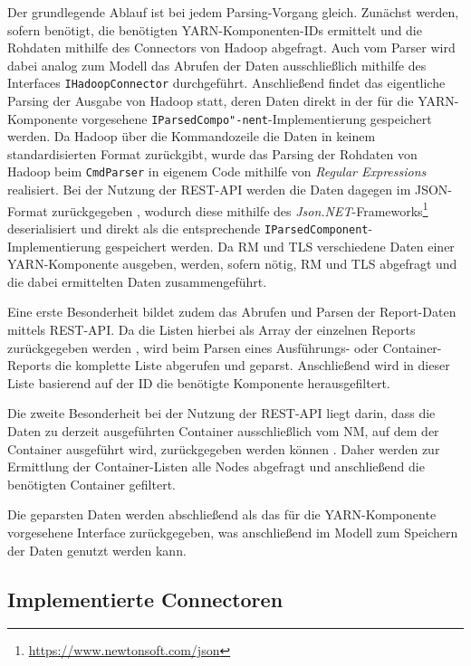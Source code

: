 Der grundlegende Ablauf ist bei jedem Parsing-Vorgang gleich. Zunächst werden, sofern benötigt, die benötigten YARN-Komponenten-IDs ermittelt und die Rohdaten mithilfe des Connectors von Hadoop abgefragt. Auch vom Parser wird dabei analog zum Modell das Abrufen der Daten ausschließlich mithilfe des Interfaces \texttt{IHadoopConnector} durchgeführt. Anschließend findet das eigentliche Parsing der Ausgabe von Hadoop statt, deren Daten direkt in der für die YARN-Komponente vorgesehene \texttt{IParsedCompo"-nent}-Implementierung gespeichert werden. Da Hadoop über die Kommandozeile die Daten in keinem standardisierten Format zurückgibt, wurde das Parsing der Rohdaten von Hadoop beim \texttt{CmdParser} in eigenem Code mithilfe von \emph{Regular Expressions} realisiert. Bei der Nutzung der REST-API werden die Daten dagegen im JSON-Format zurückgegeben \cite{HadoopYarnTlServer271,HadoopRmApi271,HadoopNmApi271}, wodurch diese mithilfe des \emph{Json.NET}-Frameworks\footnote{\url{https://www.newtonsoft.com/json}} deserialisiert und direkt als die entsprechende \texttt{IParsedComponent}-Implementierung gespeichert werden. Da \ac{RM} und \ac{TLS} verschiedene Daten einer YARN-Komponente ausgeben, werden, sofern nötig, \ac{RM} und \ac{TLS} abgefragt und die dabei ermittelten Daten zusammengeführt.

Eine erste Besonderheit bildet zudem das Abrufen und Parsen der Report-Daten mittels REST-API. Da die Listen hierbei als Array der einzelnen Reports zurückgegeben werden \cite{HadoopYarnTlServer271,HadoopRmApi271,HadoopNmApi271}, wird beim Parsen eines Ausführungs- oder Container-Reports die komplette Liste abgerufen und geparst. Anschließend wird in dieser Liste basierend auf der ID die benötigte Komponente herausgefiltert.

Die zweite Besonderheit bei der Nutzung der REST-API liegt darin, dass die Daten zu derzeit ausgeführten Container ausschließlich vom \ac{NM}, auf dem der Container ausgeführt wird, zurückgegeben werden können \cite{HadoopRmApi271,HadoopNmApi271}. Daher werden zur Ermittlung der Container-Listen alle Nodes abgefragt und anschließend die benötigten Container gefiltert.

Die geparsten Daten werden abschließend als das für die YARN-Komponente vorgesehene Interface zurückgegeben, was anschließend im Modell zum Speichern der Daten genutzt werden kann.

\subsection{Implementierte Connectoren}\label{sec:implementedConnectors}

